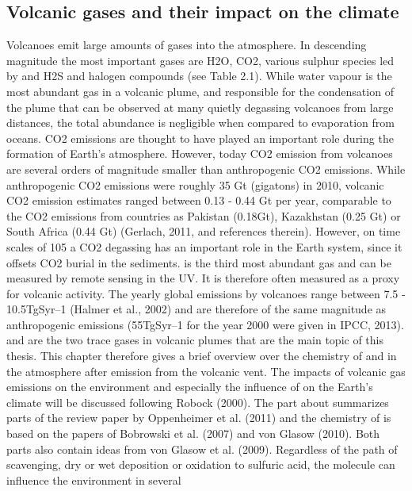 \documentclass  [
  paper    = a4,
  BCOR     = 10mm,
  twoside,
  fontsize = 12pt,
  fleqn,
  toc      = bibnumbered,
  toc      = listofnumbered,
  numbers  = noendperiod,
  headings = normal,
  listof   = leveldown,
  version  = 3.03
]                                       {scrreprt}
\begin{document}
{	\subsection{Volcanic gases and their impact on the climate}
	Volcanoes emit large amounts of gases into the atmosphere. In descending
	magnitude the most important gases are H2O, CO2, various sulphur species led
	by  and H2S and halogen compounds (see Table 2.1). While water vapour is
	the most abundant gas in a volcanic plume, and responsible for the condensation
	of the plume that can be observed at many quietly degassing volcanoes from
	large distances, the total abundance is negligible when compared to evaporation
	from oceans. CO2 emissions are thought to have played an important role
	during the formation of Earth’s atmosphere. However, today CO2 emission
	from volcanoes are several orders of magnitude smaller than anthropogenic CO2
	emissions. While anthropogenic CO2 emissions were roughly 35 Gt (gigatons)
	in 2010, volcanic CO2 emission estimates ranged between 0.13 - 0.44 Gt per
	year, comparable to the CO2 emissions from countries as Pakistan (0.18Gt),
	Kazakhstan (0.25 Gt) or South Africa (0.44 Gt) (Gerlach, 2011, and references
	therein). However, on time scales of 105 a CO2 degassing has an important role
	in the Earth system, since it offsets CO2 burial in the sediments.  is the
	third most abundant gas and can be measured by remote sensing in the UV. It
	is therefore often measured as a proxy for volcanic activity. The yearly global
	 emissions by volcanoes range between 7.5 - 10.5TgSyr–1 (Halmer et al.,
	2002) and are therefore of the same magnitude as anthropogenic  emissions
	(55TgSyr–1 for the year 2000 were given in IPCC, 2013).
	 and  are the two trace gases in volcanic plumes that are the main topic
	of this thesis. This chapter therefore gives a brief overview over the chemistry
	of  and  in the atmosphere after emission from the volcanic vent. The
	impacts of volcanic gas emissions on the environment and especially the influence
	of  on the Earth’s climate will be discussed following Robock (2000). The
	part about  summarizes parts of the review paper by Oppenheimer et al.
	(2011) and the chemistry of  is based on the papers of Bobrowski et al. (2007)
	and von Glasow (2010). Both parts also contain ideas from von Glasow et al.
	(2009).
	Regardless of the path of  scavenging,
	dry or wet deposition or oxidation
	to sulfuric acid, the molecule
	can influence the environment in several
}
\end{document}
